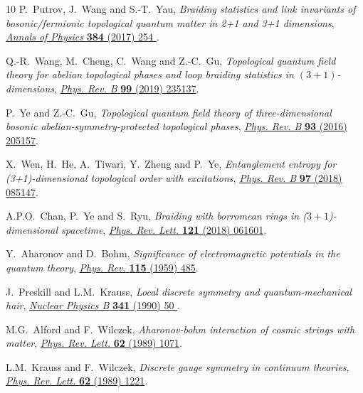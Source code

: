 \documentclass[11pt,nofootinbib,preprint]{revtex4-1}
\begin{document}
\begin{thebibliography}{10}
P.~Putrov, J.~Wang and S.-T.~Yau, \emph{Braiding statistics and link invariants
  of bosonic/fermionic topological quantum matter in 2+1 and 3+1 dimensions},
  \href{https://doi.org/https://doi.org/10.1016/j.aop.2017.06.019}{\emph{Annals
  of Physics} {\bfseries 384} (2017) 254 }.

Q.-R.~Wang, M.~Cheng, C.~Wang and Z.-C.~Gu, \emph{Topological quantum field
  theory for abelian topological phases and loop braiding statistics in
  $(3+1)$-dimensions},
  \href{https://doi.org/10.1103/PhysRevB.99.235137}{\emph{Phys. Rev. B}
  {\bfseries 99} (2019) 235137}.

P.~Ye and Z.-C.~Gu, \emph{Topological quantum field theory of three-dimensional
  bosonic abelian-symmetry-protected topological phases},
  \href{https://doi.org/10.1103/PhysRevB.93.205157}{\emph{Phys. Rev. B}
  {\bfseries 93} (2016) 205157}.

X.~Wen, H.~He, A.~Tiwari, Y.~Zheng and P.~Ye, \emph{Entanglement entropy for
  (3+1)-dimensional topological order with excitations},
  \href{https://doi.org/10.1103/PhysRevB.97.085147}{\emph{Phys. Rev. B}
  {\bfseries 97} (2018) 085147}.

A.P.O.~Chan, P.~Ye and S.~Ryu, \emph{Braiding with borromean rings in
  ($3+1$)-dimensional spacetime},
  \href{https://doi.org/10.1103/PhysRevLett.121.061601}{\emph{Phys. Rev. Lett.}
  {\bfseries 121} (2018) 061601}.

Y.~Aharonov and D.~Bohm, \emph{Significance of electromagnetic potentials in
  the quantum theory},
  \href{https://doi.org/10.1103/PhysRev.115.485}{\emph{Phys. Rev.} {\bfseries
  115} (1959) 485}.

J.~Preskill and L.M.~Krauss, \emph{Local discrete symmetry and
  quantum-mechanical hair},
  \href{https://doi.org/https://doi.org/10.1016/0550-3213(90)90262-C}{\emph{Nuclear
  Physics B} {\bfseries 341} (1990) 50 }.

M.G.~Alford and F.~Wilczek, \emph{Aharonov-bohm interaction of cosmic strings
  with matter}, \href{https://doi.org/10.1103/PhysRevLett.62.1071}{\emph{Phys.
  Rev. Lett.} {\bfseries 62} (1989) 1071}.

L.M.~Krauss and F.~Wilczek, \emph{Discrete gauge symmetry in continuum
  theories}, \href{https://doi.org/10.1103/PhysRevLett.62.1221}{\emph{Phys.
  Rev. Lett.} {\bfseries 62} (1989) 1221}.


\end{thebibliography}
\end{document}
